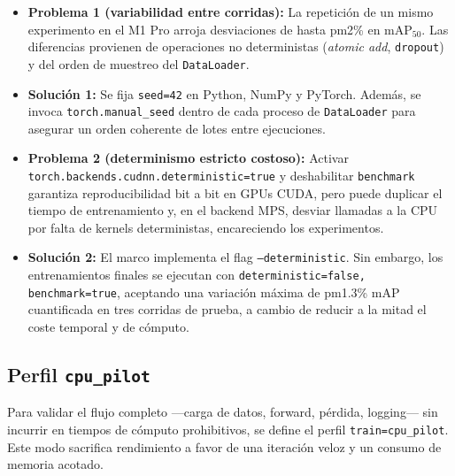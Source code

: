 \begin{itemize}
   \item \textbf{Problema 1 (variabilidad entre corridas):}
   La repetición de un mismo experimento en el M1 Pro arroja desviaciones de hasta pm2\% en \(\text{mAP}_{50}\).
   Las diferencias provienen de operaciones no deterministas (\textit{atomic add}, \texttt{dropout}) y del orden de muestreo del \texttt{DataLoader}.
   \item \textbf{Solución 1:}
   Se fija \texttt{seed=42} en Python, NumPy y PyTorch.
   Además, se invoca \texttt{torch.manual\_seed} dentro de cada proceso de \texttt{DataLoader} para asegurar un orden coherente de lotes entre ejecuciones.
   \item \textbf{Problema 2 (determinismo estricto costoso):}
   Activar \texttt{torch.backends.cudnn.deterministic=true} y deshabilitar \texttt{benchmark} garantiza reproducibilidad bit a bit en GPUs CUDA, pero puede duplicar el tiempo de entrenamiento y, en el backend MPS, desviar llamadas a la CPU por falta de kernels deterministas, encareciendo los experimentos.
   \item \textbf{Solución 2:}
   El marco implementa el flag \texttt{--deterministic}.
   Sin embargo, los entrenamientos finales se ejecutan con \texttt{deterministic=false, benchmark=true}, aceptando una variación máxima de pm1.3\% mAP cuantificada en tres corridas de prueba, a cambio de reducir a la mitad el coste temporal y de cómputo.
\end{itemize}

\subsection{Perfil \texttt{cpu\_pilot}}\label{ssec:cpu_pilot}

Para validar el flujo completo —carga de datos, forward, pérdida, logging— sin incurrir en tiempos de cómputo prohibitivos, se define el perfil \texttt{train=cpu\_pilot}.
Este modo sacrifica rendimiento a favor de una iteración veloz y un consumo de memoria acotado.

